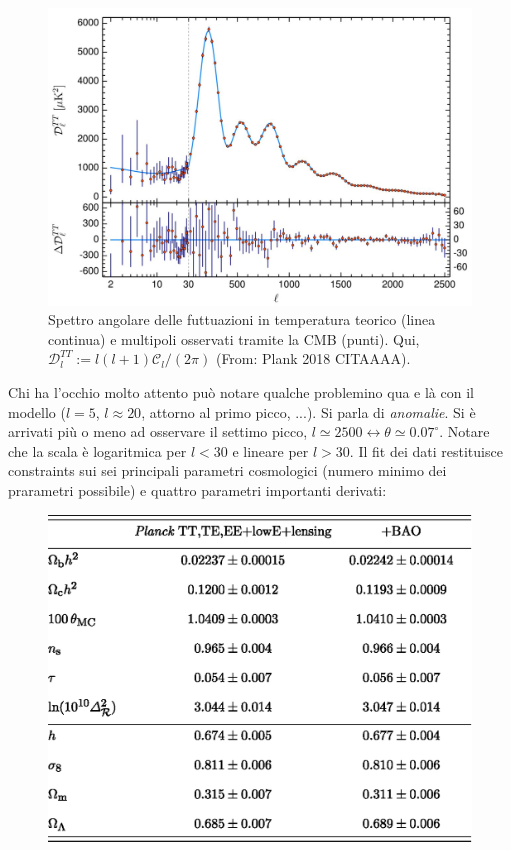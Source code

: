 \begin{figure}[H]
    \centering
    \includegraphics[width=0.72 \textwidth]{Pictures/11/angspecobs.jpg}
    \caption{Spettro angolare delle futtuazioni in temperatura teorico (linea continua) e multipoli osservati tramite la CMB (punti). Qui, $\mathcal{D}^{TT}_l:= l(l+1)\mathcal{C}_l / (2\pi)$ (From: Plank 2018 CITAAAA).  }\label{fig11:cttobs} 
\end{figure}
Chi ha l'occhio molto attento può notare qualche problemino qua e là con il modello ($l=5$, $l\approx 20$, attorno al primo picco, ...). Si parla di \textit{anomalie}. Si è arrivati più o meno ad osservare il settimo picco, $l\simeq 2500 \leftrightarrow \theta \simeq 0.07^\circ$. Notare che la scala è logaritmica per $l<30$ e lineare per $l>30$. Il fit dei dati restituisce constraints sui sei principali parametri cosmologici (numero minimo dei prarametri possibile) e quattro parametri importanti derivati:
\begin{figure}[H]
    \centering
    \includegraphics[width=0.65 \textwidth]{Pictures/11/planktable.eps}
\end{figure}
